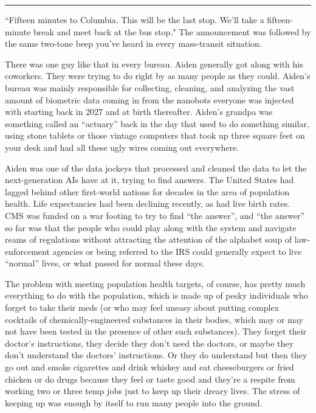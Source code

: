 \documentclass[11pt]{book}
\begin{document}
	\vspace{0.5cm}
	\hrule
	\vspace{0.5cm}
	
	``Fifteen minutes to Columbia. This will be the last stop. We'll take a fifteen-minute break and meet back at the bus stop." The announcement was followed by the same two-tone beep you've heard in every mass-transit situation.
	
	There was one guy like that in every bureau. Aiden generally got along with his coworkers. They were trying to do right by as many people as they could. Aiden's bureau was mainly responsible for collecting, cleaning, and analyzing the vast amount of biometric data coming in from the nanobots everyone was injected with starting back in 2027 and at birth thereafter. Aiden's grandpa was something called an ``actuary'' back in the day that used to do something similar, using stone tablets or those vintage computers that took up three square feet on your desk and had all these ugly wires coming out everywhere.
	
	Aiden was one of the data jockeys that processed and cleaned the data to let the next-generation AIs have at it, trying to find answers. The United States had lagged behind other first-world nations for decades in the area of population health. Life expectancies had been declining recently, as had live birth rates. CMS was funded on a war footing to try to find ``the answer'', and ``the answer'' so far was that the people who could play along with the system and navigate reams of regulations without attracting the attention of the alphabet soup of law-enforcement agencies or being referred to the IRS could generally expect to live ``normal'' lives, or what passed for normal these days.
	
	The problem with meeting population health targets, of course, has pretty much everything to do with the population, which is made up of pesky individuals who forget to take their meds (or who may feel uneasy about putting complex cocktails of  chemically-engineered substances in their bodies, which may or may not have been tested in the presence of other such substances). They forget their doctor's instructions, they decide they don't need the doctors, or maybe they don't understand the doctors' instructions. Or they do understand but then they go out and smoke cigarettes and drink whiskey and eat cheeseburgers or fried chicken or do drugs because they feel or taste good and they're a respite from working two or three temp jobs just to keep up their dreary lives. The stress of keeping up was enough by itself to run many people into the ground.
	
\end{document}
